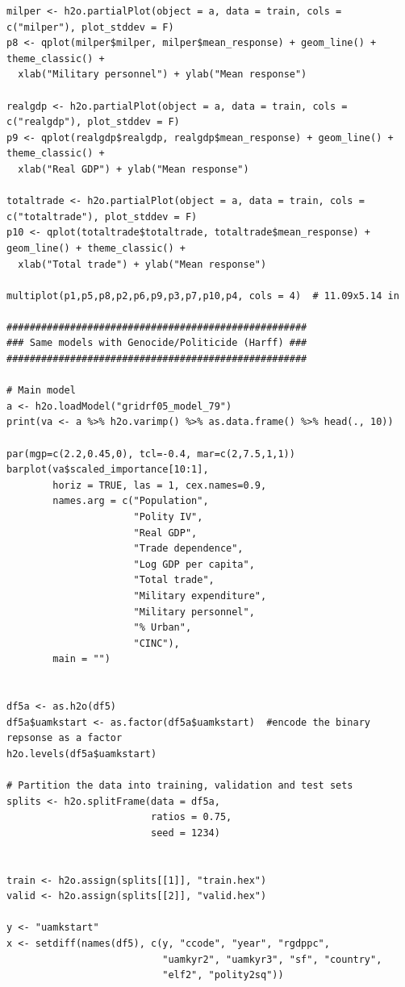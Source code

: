 \documentclass[a4paper,12pt]{article}
\begin{document}
\begin{verbatim}
milper <- h2o.partialPlot(object = a, data = train, cols = c("milper"), plot_stddev = F)
p8 <- qplot(milper$milper, milper$mean_response) + geom_line() + theme_classic() +
  xlab("Military personnel") + ylab("Mean response")

realgdp <- h2o.partialPlot(object = a, data = train, cols = c("realgdp"), plot_stddev = F)
p9 <- qplot(realgdp$realgdp, realgdp$mean_response) + geom_line() + theme_classic() +
  xlab("Real GDP") + ylab("Mean response")

totaltrade <- h2o.partialPlot(object = a, data = train, cols = c("totaltrade"), plot_stddev = F)
p10 <- qplot(totaltrade$totaltrade, totaltrade$mean_response) + geom_line() + theme_classic() +
  xlab("Total trade") + ylab("Mean response")

multiplot(p1,p5,p8,p2,p6,p9,p3,p7,p10,p4, cols = 4)  # 11.09x5.14 in

####################################################
### Same models with Genocide/Politicide (Harff) ###
####################################################

# Main model
a <- h2o.loadModel("gridrf05_model_79")
print(va <- a %>% h2o.varimp() %>% as.data.frame() %>% head(., 10)) 

par(mgp=c(2.2,0.45,0), tcl=-0.4, mar=c(2,7.5,1,1))
barplot(va$scaled_importance[10:1],
        horiz = TRUE, las = 1, cex.names=0.9,
        names.arg = c("Population",
                      "Polity IV",
                      "Real GDP", 
                      "Trade dependence", 
                      "Log GDP per capita",
                      "Total trade",
                      "Military expenditure", 
                      "Military personnel",
                      "% Urban",
                      "CINC"),
        main = "")


df5a <- as.h2o(df5)
df5a$uamkstart <- as.factor(df5a$uamkstart)  #encode the binary repsonse as a factor
h2o.levels(df5a$uamkstart)

# Partition the data into training, validation and test sets
splits <- h2o.splitFrame(data = df5a, 
                         ratios = 0.75, 
                         seed = 1234) 


train <- h2o.assign(splits[[1]], "train.hex")   
valid <- h2o.assign(splits[[2]], "valid.hex") 

y <- "uamkstart"
x <- setdiff(names(df5), c(y, "ccode", "year", "rgdppc",
                           "uamkyr2", "uamkyr3", "sf", "country",
                           "elf2", "polity2sq")) 



\end{verbatim}
\end{document}
